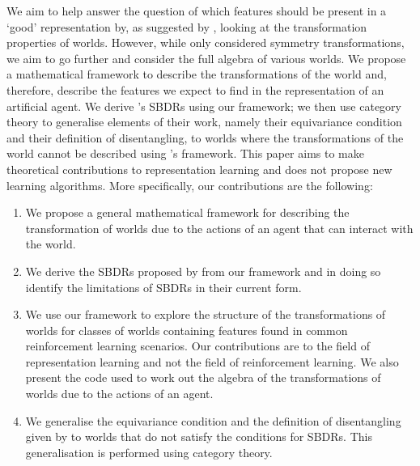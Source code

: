 We aim to help answer the question of which features should be present in a `good' representation by, as suggested by \autocite{Higgins2018}, looking at the transformation properties of worlds.
However, while \autocite{Higgins2018} only considered symmetry transformations, we aim to go further and consider the full algebra of various worlds.
We propose a mathematical framework to describe the transformations of the world and, therefore, describe the features we expect to find in the representation of an artificial agent.
We derive \autocite{Higgins2018}'s SBDRs using our framework; we then use category theory to generalise elements of their work, namely their equivariance condition and their definition of disentangling, to worlds where the transformations of the world cannot be described using \autocite{Higgins2018}'s framework.
This paper aims to make theoretical contributions to representation learning and does not propose new learning algorithms.
More specifically, our contributions are the following:
\begin{enumerate}
    \item We propose a general mathematical framework for describing the transformation of worlds due to the actions of an agent that can interact with the world.
    
    \item We derive the SBDRs proposed by \autocite{Higgins2018} from our framework and in doing so identify the limitations of SBDRs in their current form.
    
    \item We use our framework to explore the structure of the transformations of worlds for classes of worlds containing features found in common reinforcement learning scenarios.
    Our contributions are to the field of representation learning and not the field of reinforcement learning.
    We also present the code used to work out the algebra of the transformations of worlds due to the actions of an agent.
    
    \item We generalise the equivariance condition and the definition of disentangling given by \autocite{Higgins2018} to worlds that do not satisfy the conditions for SBDRs.
    This generalisation is performed using category theory.
\end{enumerate}


